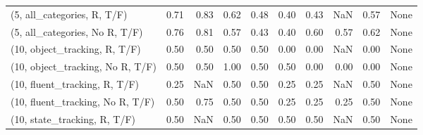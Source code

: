 \begin{table*}[h!]
\begin{adjustbox}{width=2\columnwidth,center}
\begin{tabular}{lrrr|rrr|rrr}
(5, all\_categories, R, T/F)          &                      0.71 &                  0.83 &                      0.62 &                          0.48 &                      0.40 &                          0.43 &                                    NaN &                               0.57 &                                  None \\
(5, all\_categories, No R, T/F)       &                      0.76 &                  0.81 &                      0.57 &                          0.43 &                      0.40 &                          0.60 &                                   0.57 &                               0.62 &                                  None \\



\midrule
(10, object\_tracking, R, T/F)         &                      0.50 &                  0.50 &                      0.50 &                          0.50 &                      0.00 &                          0.00 &                                    NaN &                               0.00 &                                  None \\
(10, object\_tracking, No R, T/F)      &                      0.50 &                  0.50 &                      1.00 &                          0.50 &                      0.50 &                          0.00 &                                   0.00 &                               0.00 &                                  None \\
(10, fluent\_tracking, R, T/F)         &                      0.25 &                   NaN &                      0.50 &                          0.50 &                      0.25 &                          0.25 &                                    NaN &                               0.50 &                                  None \\
(10, fluent\_tracking, No R, T/F)      &                      0.50 &                  0.75 &                      0.50 &                          0.50 &                      0.25 &                          0.25 &                                   0.25 &                               0.50 &                                  None \\
(10, state\_tracking, R, T/F)          &                      0.50 &                   NaN &                      0.50 &                          0.50 &                      0.50 &                          0.50 &                                    NaN &                               0.50 &                                  None \\

\end{tabular}
\end{adjustbox}
\end{table*}
